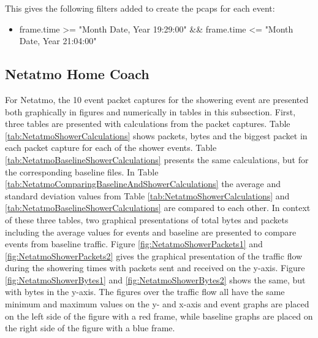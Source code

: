 This gives the following filters added to create the pcaps for each event:
\begin{itemize}
    \item frame.time >= "Month Date, Year 19:29:00" && frame.time <= "Month Date, Year 21:04:00"
\end{itemize}

\newpage
\subsection{Netatmo Home Coach}
For Netatmo, the 10 event packet captures for the showering event are presented both graphically in figures and numerically in tables in this subsection. First, three tables are presented with calculations from the packet captures. Table \ref{tab:NetatmoShowerCalculations} shows packets, bytes and the biggest packet in each packet capture for each of the shower events. Table \ref{tab:NetatmoBaselineShowerCalculations} presents the same calculations, but for the corresponding baseline files. In Table \ref{tab:NetatmoComparingBaselineAndShowerCalculations} the average and standard deviation values from Table \ref{tab:NetatmoShowerCalculations} and \ref{tab:NetatmoBaselineShowerCalculations} are compared to each other. In context of these three tables, two graphical presentations of total bytes and packets including the average values for events and baseline are presented to compare events from baseline traffic. Figure \ref{fig:NetatmoShowerPackets1} and \ref{fig:NetatmoShowerPackets2} gives the graphical presentation of the traffic flow during the showering times with packets sent and received on the y-axis. Figure \ref{fig:NetatmoShowerBytes1} and \ref{fig:NetatmoShowerBytes2} shows the same, but with bytes in the y-axis. The figures over the traffic flow all have the same minimum and maximum values on the y- and x-axis and event graphs are placed on the left side of the figure with a red frame, while baseline graphs are placed on the right side of the figure with a blue frame. 

